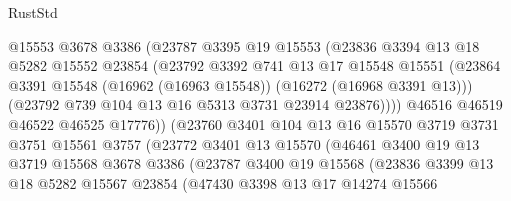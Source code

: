 \begin{lexlean}{RustStd}
\begin{coremodule}
                          @15553
                          @3678
                          @3386
                          (@23787
                            @3395
                            @19
                            @15553
                            (@23836
                              @3394
                              @13
                              @18
                              @5282
                              @15552
                              @23854
                              (@23792
                                @3392
                                @741
                                @13
                                @17
                                @15548
                                @15551
                                (@23864
                                  @3391
                                  @15548
                                  (@16962 (@16963 @15548))
                                  (@16272 (@16968 @3391 @13)))
                                (@23792 @739 @104 @13 @16 @5313 @3731 @23914 @23876))))
                          @46516
                          @46519
                          @46522
                          @46525
                          @17776))
                      (@23760
                        @3401
                        @104
                        @13
                        @16
                        @15570
                        @3719
                        @3731
                        @3751
                        @15561
                        @3757
                        (@23772
                          @3401
                          @13
                          @15570
                          (@46461
                            @3400
                            @19
                            @13
                            @3719
                            @15568
                            @3678
                            @3386
                            (@23787
                              @3400
                              @19
                              @15568
                              (@23836
                                @3399
                                @13
                                @18
                                @5282
                                @15567
                                @23854
                                (@47430
                                  @3398
                                  @13
                                  @17
                                  @14274
                                  @15566

\end{coremodule}
\end{lexlean}

